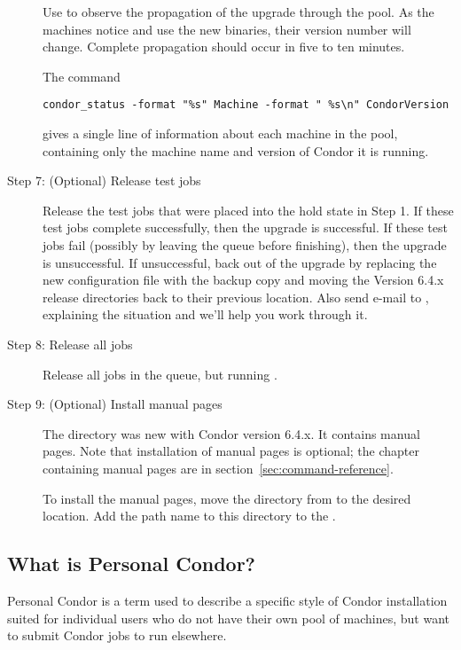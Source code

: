 \begin{description}
Use  to observe the propagation of the upgrade
through the pool.
As the machines notice and use the new binaries, their
version number will change.
Complete propagation should occur in five to ten minutes.

The command
\footnotesize
\begin{verbatim}
condor_status -format "%s" Machine -format " %s\n" CondorVersion
\end{verbatim}
\normalsize
gives a single line of information about each machine in the pool,
containing only the machine name and version of Condor it is
running.

\item[Step 7:  (Optional) Release test jobs]
Release the test jobs that were placed into the hold state
in Step 1.
If these test jobs complete successfully, then the upgrade is
successful.
If these test jobs fail (possibly by leaving the queue before
finishing), then the upgrade is unsuccessful.
If unsuccessful, back out of the upgrade by
replacing the new configuration file with the backup copy and
moving the Version 6.4.x release directories back to their
previous location.
Also send e-mail to ,
explaining the situation and we'll help you work through it.

\item[Step 8:  Release all jobs]
Release all jobs in the queue, but running .

\item[Step 9:  (Optional) Install manual pages]

The  directory was new with Condor version 6.4.x.
It contains manual pages.
Note that installation of manual pages is optional;
the chapter containing manual pages are in
section~\ref{sec:command-reference}.

To install the manual pages, move the  directory
from  to the desired location.
Add the path name to this directory to the
.

\end{description}

\subsection*{What is Personal Condor?}

Personal Condor is a term used to describe a specific style of Condor
installation suited for individual users who do not have their own
pool of machines, but want to submit Condor jobs to run elsewhere.

